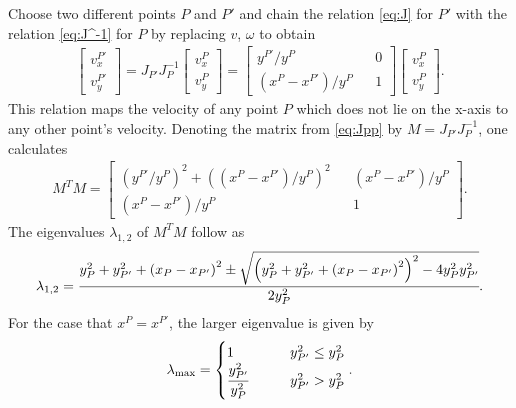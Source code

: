 \documentclass{article}
\begin{document}
Choose two different points $ P $ and $ P' $ and chain the relation \eqref{eq:J} for $ P' $ with the relation \eqref{eq:J^-1} for $ P $ by replacing $ v $, $ \omega $ to obtain
\begin{align}\label{eq:Jpp}
\begin{bmatrix}
v_x^{P'} \\
v_y^{P'}
\end{bmatrix}
= 
J_{P'}J_P^{-1}
\begin{bmatrix}
v_x^P \\
v_y^P
\end{bmatrix} = 
\begin{bmatrix}
y^{P'}/y^P && 0\\
(x^P - x^{P'})/y^P && 1
\end{bmatrix}
\begin{bmatrix}
v_x^P \\
v_y^P
\end{bmatrix} .
\end{align}
This relation maps the velocity of any point $ P $ which does not lie on the x-axis to any other point's velocity. Denoting the matrix from \eqref{eq:Jpp} by $ M =  J_{P'}J_P^{-1}$, one calculates
\begin{align*}
M^TM = \begin{bmatrix}
{\left(y^{P'}/y^P\right)}^2 + {\left((x^P - x^{P'})/y^P\right)}^2 && (x^P - x^{P'})/y^P\\
(x^P - x^{P'})/y^P && 1
\end{bmatrix} .
\end{align*}
The eigenvalues $ \lambda_{1,2} $ of $ M^TM $ follow as
\begin{align*}
\lambda_{1,2} = \cfrac{y_P^2 + y_{P'}^2 + {\left(x_P - x_{P'}\right)}^2 \pm \sqrt{{\left(y_P^2 + y_{P'}^2 + {\left(x_P - x_{P'}\right)}^2\right)}^2 - 4y_P^2y_{P'}^2}}{2y_P^2} .
\end{align*}
For the case that $ x^P = x^{P'} $, the larger eigenvalue is given by
\begin{align*}
\lambda_\text{max} = \begin{cases}1\quad\quad&y_{P'}^2 \leq y_P^2\\\cfrac{y_{P'}^2}{y_P^2}\quad\quad &y_{P'}^2 > y_P^2\end{cases}.
\end{align*}
\end{document}
